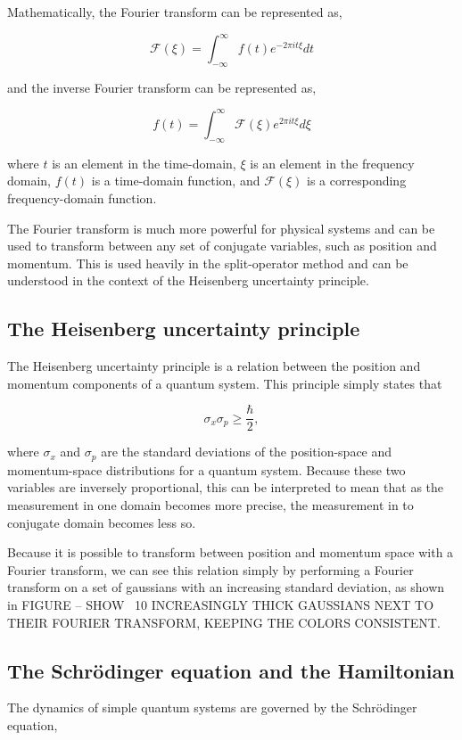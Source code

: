 Mathematically, the Fourier transform can be represented as,

$$
\mathcal{F}(\xi) = \int_{-\infty}^{\infty}f(t)e^{-2\pi i t \xi}dt
$$

and the inverse Fourier transform can be represented as,

$$
f(t) = \int_{-\infty}^{\infty}\mathcal{F}(\xi)e^{2\pi i t \xi}d\xi
$$

where $t$ is an element in the time-domain, $\xi$ is an element in the frequency domain, $f(t)$ is a time-domain function, and $\mathcal{F}(\xi)$ is a corresponding frequency-domain function.

The Fourier transform is much more powerful for physical systems and can be used to transform between any set of conjugate variables, such as position and momentum.
This is used heavily in the split-operator method and can be understood in the context of the Heisenberg uncertainty principle.

\subsection{The Heisenberg uncertainty principle}

The Heisenberg uncertainty principle is a relation between the position and momentum components of a quantum system.
This principle simply states that

$$
\sigma_x \sigma_p \geq \frac{\hbar}{2},
$$

where $\sigma_x$ and $\sigma_p$ are the standard deviations of the position-space and momentum-space distributions for a quantum system.
Because these two variables are inversely proportional, this can be interpreted to mean that as the measurement in one domain becomes more precise, the measurement in to conjugate domain becomes less so.

Because it is possible to transform between position and momentum space with a Fourier transform, we can see this relation simply by performing a Fourier transform on a set of gaussians with an increasing standard deviation, as shown in FIGURE -- SHOW ~10 INCREASINGLY THICK GAUSSIANS NEXT TO THEIR FOURIER TRANSFORM, KEEPING THE COLORS CONSISTENT.

\subsection{The Schr\"odinger equation and the Hamiltonian}

The dynamics of simple quantum systems are governed by the Schr\"odinger equation,

